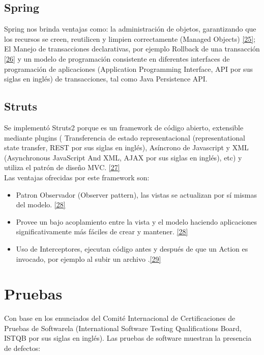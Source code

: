 \subsection {Spring}
Spring nos brinda ventajas como: la administración de objetos, garantizando que los recursos se creen, reutilicen y limpien correctamente (Managed Objects) \hyperlink{b25}{[25]}; El Manejo de transacciones declarativas, por ejemplo Rollback de una transacción \hyperlink{b26}{[26]} y un modelo de programación consistente en diferentes interfaces de programación de aplicaciones (Application Programming Interface, API por sus siglas en inglés) de transacciones, tal como Java Persistence API.

\subsection {Struts}
Se implementó Struts2 porque es un framework de código abierto, extensible mediante plugins ( Transferencia de estado representacional (representational state transfer, REST por sus siglas en inglés), Asíncrono de Javascript y XML (Asynchronous JavaScript And XML, AJAX por sus siglas en inglés), etc) y utiliza el patrón de diseño MVC. \hyperlink{b27}{[27]} \\ 

Las ventajas ofrecidas por este framework son: 

\begin{itemize}
	\item Patron Observador (Observer pattern), las vistas se actualizan por sí mismas del modelo. \hyperlink{b28}{[28]}
	\item Provee un bajo acoplamiento entre la vista y el modelo haciendo aplicaciones significativamente más fáciles de crear y mantener. \hyperlink{b28}{[28]}
	\item Uso de Interceptores, ejecutan código antes y después de que un Action es invocado, por ejemplo al subir un archivo .\hyperlink{b29}{[29]}
\end{itemize}

\newpage

\section{Pruebas}

Con base en los enunciados del Comité Internacional de Certificaciones de Pruebas de Softwarela (International Software Testing Qualifications Board, ISTQB por sus siglas en inglés). Las pruebas de software muestran la presencia de defectos:\\

